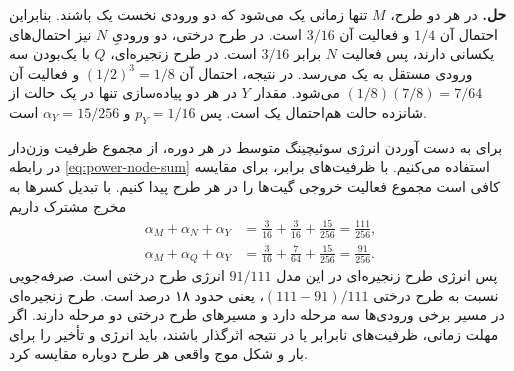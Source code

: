 \textbf{حل.}
در هر دو طرح، \(M\) تنها زمانی یک می‌شود که دو ورودی نخست یک
باشند. بنابراین احتمال آن \(1/4\) و فعالیت آن \(3/16\) است.
در طرح درختی، دو ورودیِ \(N\) نیز احتمال‌های یکسانی دارند، پس
فعالیت \(N\) برابر \(3/16\) است. در طرح زنجیره‌ای، \(Q\) با
یک‌بودن سه ورودی مستقل به یک می‌رسد. در نتیجه، احتمال آن
\((1/2)^3=1/8\) و فعالیت آن \((1/8)(7/8)=7/64\) می‌شود.
مقدار \(Y\) در هر دو پیاده‌سازی تنها در یک حالت از شانزده حالت
هم‌احتمال یک است. پس \(p_Y=1/16\) و \(\alpha_Y=15/256\) است.

برای به دست آوردن انرژی سوئیچینگ متوسط در هر دوره، از مجموع ظرفیت
وزن‌دار در رابطه \eqref{eq:power-node-sum} استفاده می‌کنیم. با
ظرفیت‌های برابر، برای مقایسه کافی است مجموع فعالیت خروجی گیت‌ها
را در هر طرح پیدا کنیم. با تبدیل کسرها به مخرج مشترک داریم
\[
  \begin{aligned}
    \alpha_M+\alpha_N+\alpha_Y
      &=\frac{3}{16}+\frac{3}{16}+\frac{15}{256}=\frac{111}{256},\\
    \alpha_M+\alpha_Q+\alpha_Y
      &=\frac{3}{16}+\frac{7}{64}+\frac{15}{256}=\frac{91}{256}.
  \end{aligned}
\]
پس انرژی طرح زنجیره‌ای در این مدل \(91/111\) انرژی طرح درختی است.
صرفه‌جویی نسبت به طرح درختی \((111-91)/111\)، یعنی حدود ۱۸ درصد
است. طرح زنجیره‌ای در مسیر برخی ورودی‌ها سه مرحله دارد و مسیرهای
طرح درختی دو مرحله دارند. اگر مهلت زمانی، ظرفیت‌های نابرابر یا
 در نتیجه اثرگذار باشند، باید انرژی و تأخیر را برای
بار و شکل موج واقعی هر طرح دوباره مقایسه کرد.

